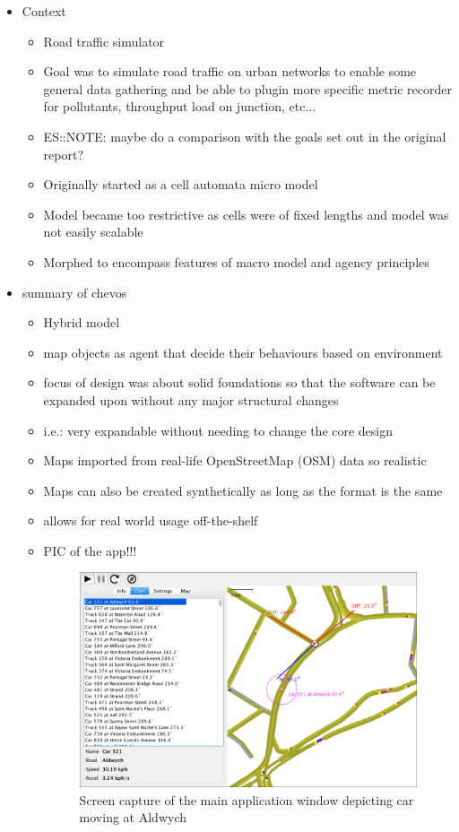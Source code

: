 \begin{itemize}
	\item Context
	\begin{itemize}
		\item Road traffic simulator
		\item Goal was to simulate road traffic on urban networks to enable some general data gathering and be able to plugin more specific metric recorder for pollutants, throughput load on junction, etc...
		\item ES::NOTE: maybe do a comparison with the goals set out in the original report?
		\item Originally started as a cell automata micro model
		\item Model became too restrictive as cells were of fixed lengths and model was not easily scalable
		\item Morphed to encompass features of macro model and agency principles
	\end{itemize}
	\item summary of chevos
	\begin{itemize}
		\item Hybrid model
		\item map objects as agent that decide their behaviours based on environment
		\item focus of design was about solid foundations so that the software can be expanded upon without any major structural changes
		\item i.e.: very expandable without needing to change the core design
		\item Maps imported from real-life OpenStreetMap (OSM) data so realistic
		\item Maps can also be created synthetically as long as the format is the same
		\item allows for real world usage off-the-shelf
		\item PIC of the app!!!
		\begin{figure}[h]
        	\vspace{1.5em}
            \caption{Screen capture of the main application window depicting car moving at Aldwych}
            \label{fig:screenshot}
            \centering
            \includegraphics[width=1\textwidth]{figs/mainWindowWithStrand.png}
            \vspace{1.5em}
        \end{figure}


\end{itemize}
\end{itemize}

